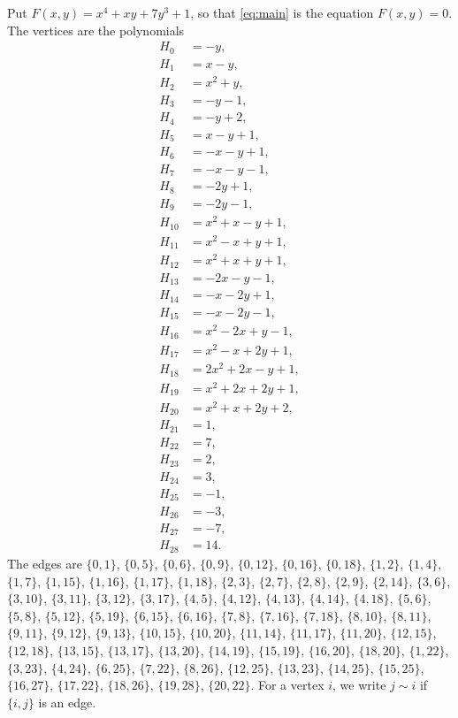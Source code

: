 \documentclass[11pt]{article}
\begin{document}
Put $F(x,y)=x^{4}+xy+7y^{3}+1$, so that \eqref{eq:main} is the equation $F(x,y)=0$. The vertices are the polynomials
\begin{align*}
H_{0}&=-y,\\
H_{1}&=x-y,\\
H_{2}&=x^{2}+y,\\
H_{3}&=-y-1,\\
H_{4}&=-y+2,\\
H_{5}&=x-y+1,\\
H_{6}&=-x-y+1,\\
H_{7}&=-x-y-1,\\
H_{8}&=-2y+1,\\
H_{9}&=-2y-1,\\
H_{10}&=x^{2}+x-y+1,\\
H_{11}&=x^{2}-x+y+1,\\
H_{12}&=x^{2}+x+y+1,\\
H_{13}&=-2x-y-1,\\
H_{14}&=-x-2y+1,\\
H_{15}&=-x-2y-1,\\
H_{16}&=x^{2}-2x+y-1,\\
H_{17}&=x^{2}-x+2y+1,\\
H_{18}&=2x^{2}+2x-y+1,\\
H_{19}&=x^{2}+2x+2y+1,\\
H_{20}&=x^{2}+x+2y+2,\\
H_{21}&=1,\\
H_{22}&=7,\\
H_{23}&=2,\\
H_{24}&=3,\\
H_{25}&=-1,\\
H_{26}&=-3,\\
H_{27}&=-7,\\
H_{28}&=14.
\end{align*}
The edges are $\{0,1\}$, $\{0,5\}$, $\{0,6\}$, $\{0,9\}$, $\{0,12\}$, $\{0,16\}$, $\{0,18\}$, $\{1,2\}$, $\{1,4\}$, $\{1,7\}$, $\{1,15\}$, $\{1,16\}$, $\{1,17\}$, $\{1,18\}$, $\{2,3\}$, $\{2,7\}$, $\{2,8\}$, $\{2,9\}$, $\{2,14\}$, $\{3,6\}$, $\{3,10\}$, $\{3,11\}$, $\{3,12\}$, $\{3,17\}$, $\{4,5\}$, $\{4,12\}$, $\{4,13\}$, $\{4,14\}$, $\{4,18\}$, $\{5,6\}$, $\{5,8\}$, $\{5,12\}$, $\{5,19\}$, $\{6,15\}$, $\{6,16\}$, $\{7,8\}$, $\{7,16\}$, $\{7,18\}$, $\{8,10\}$, $\{8,11\}$, $\{9,11\}$, $\{9,12\}$, $\{9,13\}$, $\{10,15\}$, $\{10,20\}$, $\{11,14\}$, $\{11,17\}$, $\{11,20\}$, $\{12,15\}$, $\{12,18\}$, $\{13,15\}$, $\{13,17\}$, $\{13,20\}$, $\{14,19\}$, $\{15,19\}$, $\{16,20\}$, $\{18,20\}$, $\{1,22\}$, $\{3,23\}$, $\{4,24\}$, $\{6,25\}$, $\{7,22\}$, $\{8,26\}$, $\{12,25\}$, $\{13,23\}$, $\{14,25\}$, $\{15,25\}$, $\{16,27\}$, $\{17,22\}$, $\{18,26\}$, $\{19,28\}$, $\{20,22\}$. For a vertex $i$, we write $j\sim i$ if $\{i,j\}$ is an edge.
\end{document}
